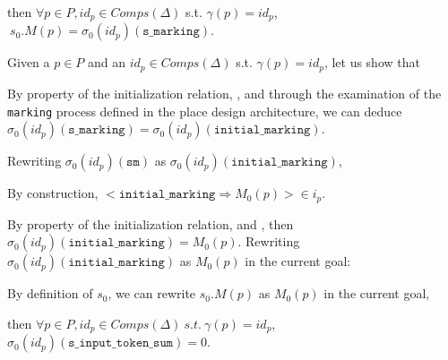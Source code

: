 \documentclass[dvipsnames,12pt]{article}
\begin{document}
\begin{lemma}
  \label{lem:init-states-eq-marking}
  \inithyps{} then
  $\forall{}p\in{}P,id_p\in{}Comps(\Delta)$ s.t. $\gamma(p)=id_p$,
  $~s_0.M(p)=\sigma_0(id_p)(\texttt{s\_marking})$.
\end{lemma}

\begin{niproof}
  Given a $p\in{}P$ and an $id_p\in{}Comps(\Delta)$
  s.t. $\gamma(p)=id_p$, let us show that\\

  \exP{}
  
  By property of the \hvhdl{} initialization relation, \InCsCompP{},
  and through the examination of the \texttt{marking} process defined
  in the place design architecture, we can deduce
  $\sigma_0(id_p)(\texttt{s\_marking})=\sigma_0(id_p)(\texttt{initial\_marking})$.

  Rewriting $\sigma_0(id_p)(\texttt{sm})$ as
  $\sigma_0(id_p)(\texttt{initial\_marking})$,\\
  
  By construction,
  ${<}\mathtt{initial\_marking\Rightarrow}M_0(p){>}\in{}i_p$.

  By property of the \hvhdl{} initialization relation, and \InCsCompP,
  then $\sigma_0(id_p)(\texttt{initial\_marking})=M_0(p)$.  Rewriting
  $\sigma_0(id_p)(\texttt{initial\_marking})$ as $M_0(p)$ in the current
  goal: 
  
  By definition of $s_0$, we can rewrite $s_0.M(p)$ as $M_0(p)$ in the
  current goal, 
  
\end{niproof}

\begin{lemma}
  \label{lem:init-states-sits-zero}
  \inithyps{} then
  $\forall{}p\in{}P,id_p\in{}Comps(\Delta)~s.t.~\gamma(p)=id_p$,
  $\sigma_0(id_p)(\texttt{s\_input\_token\_sum})=0$.
\end{lemma}
\end{document}
